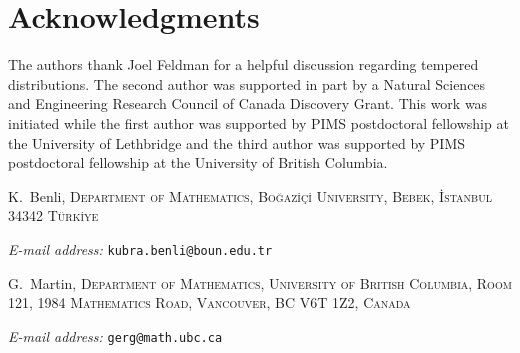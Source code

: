 \documentclass[11pt]{article}
\makeatletter
\theoremstyle{plain}
\theoremstyle{definition}
\numberwithin{equation}{section}
\newcommand{\0}{{\vec 0}}
\newcommand{\Addresses}{ \bigskip
  \footnotesize

K.~Benli, \textsc{Department of Mathematics,
Bo\u{g}az\.{i}\c{c}\.{i} University,  
Bebek, \.{I}stanbul 34342 
T\"{u}rk\.{i}ye}\par\nopagebreak
  \textit{E-mail address:}  \texttt{kubra.benli@boun.edu.tr}

  \medskip

  G.~Martin, \textsc{Department of Mathematics,
University of British Columbia,
Room 121, 1984 Mathematics Road,
Vancouver, BC  V6T 1Z2, Canada}\par\nopagebreak
  \textit{E-mail address:} \texttt{gerg@math.ubc.ca}


}
\makeatother
\begin{document}
\section*{Acknowledgments}

The authors thank Joel Feldman for a helpful discussion regarding tempered distributions. The second author was supported in part by a Natural Sciences and Engineering Research Council of Canada Discovery Grant. This work was initiated while the first author was supported by PIMS postdoctoral fellowship at the University of Lethbridge and the third author was supported by PIMS postdoctoral fellowship at the University of British Columbia.


\printbibliography
\Addresses
\end{document}

